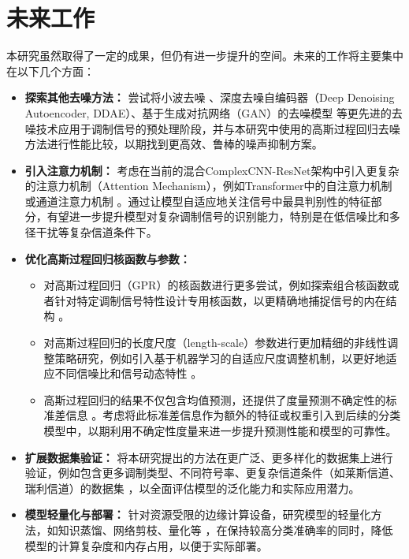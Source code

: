 \documentclass[conference]{IEEEtran}
\begin{document}
\section{未来工作}
本研究虽然取得了一定的成果，但仍有进一步提升的空间。未来的工作将主要集中在以下几个方面：

\begin{itemize}
    \item \textbf{探索其他去噪方法：} 尝试将小波去噪 \cite{[55]}\cite{[56]}、深度去噪自编码器（Deep Denoising Autoencoder, DDAE）\cite{[20]}、基于生成对抗网络（GAN）的去噪模型 \cite{[15]}\cite{[16_MISSING]} 等更先进的去噪技术应用于调制信号的预处理阶段，并与本研究中使用的高斯过程回归去噪方法进行性能比较，以期找到更高效、鲁棒的噪声抑制方案。
    \item \textbf{引入注意力机制：} 考虑在当前的混合ComplexCNN-ResNet架构中引入更复杂的注意力机制（Attention Mechanism），例如Transformer中的自注意力机制 \cite{[39_MISSING]}\cite{[40_MISSING]} 或通道注意力机制 \cite{b5}。通过让模型自适应地关注信号中最具判别性的特征部分，有望进一步提升模型对复杂调制信号的识别能力，特别是在低信噪比和多径干扰等复杂信道条件下。
    \item \textbf{优化高斯过程回归核函数与参数：}
    \begin{itemize}
        \item 对高斯过程回归（GPR）的核函数进行更多尝试，例如探索组合核函数或者针对特定调制信号特性设计专用核函数，以更精确地捕捉信号的内在结构 \cite{[17]}\cite{[18]}。
        \item 对高斯过程回归的长度尺度（length-scale）参数进行更加精细的非线性调整策略研究，例如引入基于机器学习的自适应尺度调整机制，以更好地适应不同信噪比和信号动态特性 \cite{b1}\cite{[63]}。
        \item 高斯过程回归的结果不仅包含均值预测，还提供了度量预测不确定性的标准差信息 \cite{[17]}\cite{[18]}。考虑将此标准差信息作为额外的特征或权重引入到后续的分类模型中，以期利用不确定性度量来进一步提升预测性能和模型的可靠性。
    \end{itemize}
    \item \textbf{扩展数据集验证：} 将本研究提出的方法在更广泛、更多样化的数据集上进行验证，例如包含更多调制类型、不同符号率、更复杂信道条件（如莱斯信道、瑞利信道）的数据集 \cite{[5]}\cite{[12]}，以全面评估模型的泛化能力和实际应用潜力。
    \item \textbf{模型轻量化与部署：} 针对资源受限的边缘计算设备，研究模型的轻量化方法，如知识蒸馏、网络剪枝、量化等 \cite{[5]}\cite{b4}，在保持较高分类准确率的同时，降低模型的计算复杂度和内存占用，以便于实际部署。
\end{itemize}
\end{document}
